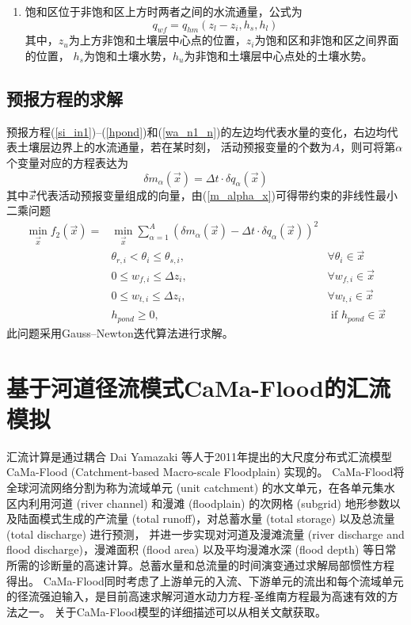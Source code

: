 \begin{enumerate}
    \item 饱和区位于非饱和区上方时两者之间的水流通量，公式为
    \begin{equation}
    q_{w f}=q_{h m}\left(z_{l}-z_{i}, h_{s}, h_{l}\right)
    \end{equation}
    其中，$z_u$为上方非饱和土壤层中心点的位置，$z_i$为饱和区和非饱和区之间界面的位置，
    $h_s$为饱和土壤水势，$h_u$为非饱和土壤层中心点处的土壤水势。
\end{enumerate}


\subsection{预报方程的求解}
预报方程(\ref{si_in1})--(\ref{hpond})和(\ref{wa_n1_n})的左边均代表水量的变化，右边均代表土壤层边界上的水流通量，若在某时刻，
活动预报变量的个数为$A$，则可将第$\alpha$个变量对应的方程表达为
\begin{equation}\label{m_alpha_x}
\delta m_{\alpha}(\vec{x})=\Delta t \cdot \delta q_{\alpha}(\vec{x})
\end{equation}
其中$\vec{x}$⃗代表活动预报变量组成的向量，由(\ref{m_alpha_x})可得带约束的非线性最小二乘问题
\begin{equation}
\begin{aligned}
\min _{\vec{x}} f_{2}(\vec{x})=& \min _{\vec{x}} \sum_{\alpha=1}^{A}\left(\delta m_{\alpha}(\vec{x})-\Delta t \cdot \delta q_{\alpha}(\vec{x})\right)^{2} \\ 
& \theta_{r, i}<\theta_{i} \leq \theta_{s, i}, & \forall \theta_{i} \in \vec{x} \\ 
& 0 \leq w_{f, i} \leq \Delta z_{i},               & \forall w_{f, i} \in \vec{x} \\ 
& 0 \leq w_{t, i} \leq \Delta z_{i},               & \forall w_{t, i} \in \vec{x} \\ 
& h_{ {pond }} \geq 0,                               & \text{ if } h_{ {pond }} \in \vec{x} 
\end{aligned}
\end{equation}
此问题采用Gauss--Newton迭代算法进行求解。

\section{基于河道径流模式CaMa-Flood的汇流模拟}
汇流计算是通过耦合 Dai Yamazaki 等人于2011年提出的大尺度分布式汇流模型 CaMa-Flood (Catchment-based Macro-scale Floodplain) 实现的\citep{yamazaki2011physically}。
CaMa-Flood将全球河流网络分割为称为流域单元 (unit catchment) 的水文单元，在各单元集水区内利用河道 (river channel) 和漫滩 (floodplain) 的次网格 (subgrid) 
地形参数以及陆面模式生成的产流量 (total runoff)，对总蓄水量 (total storage) 以及总流量 (total discharge) 进行预测，
并进一步实现对河道及漫滩流量 (river discharge and flood discharge)，漫滩面积 (flood area) 以及平均漫滩水深 (flood depth) 
等日常所需的诊断量的高速计算。总蓄水量和总流量的时间演变通过求解局部惯性方程 \citep{bates2010} 得出。
CaMa-Flood同时考虑了上游单元的入流、下游单元的流出和每个流域单元的径流强迫输入，是目前高速求解河道水动力方程-圣维南方程最为高速有效的方法之一。
关于CaMa-Flood模型的详细描述可以从相关文献获取\citep{yamazaki2011physically,yamazaki2013improving,yamazaki2014regional,yamazaki2014development}。


